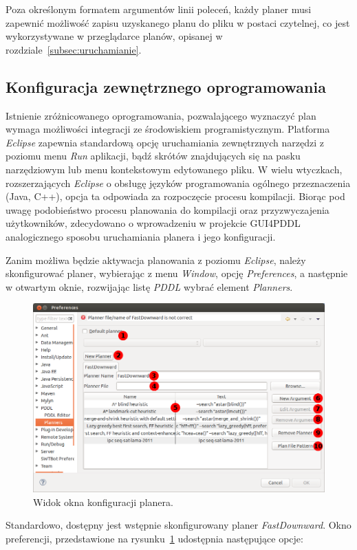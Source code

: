 Poza określonym formatem argumentów linii poleceń, każdy planer musi zapewnić możliwość zapisu uzyskanego planu do pliku w postaci czytelnej, co jest wykorzystywane w przeglądarce planów, opisanej w rozdziale~\ref{subsec:uruchamianie}.

\subsection{Konfiguracja zewnętrznego oprogramowania}
\label{subsec:konfiguracja}
Istnienie zróżnicowanego oprogramowania, pozwalającego wyznaczyć plan wymaga możliwości integracji ze środowiskiem programistycznym. Platforma \emph{Eclipse} zapewnia standardową opcję uruchamiania zewnętrznych narzędzi z poziomu menu \emph{Run} aplikacji, bądź skrótów znajdujących się na pasku narzędziowym lub menu kontekstowym edytowanego pliku. W wielu wtyczkach, rozszerzających \emph{Eclipse} o obsługę języków programowania ogólnego przeznaczenia (Java, C++), opcja ta odpowiada za rozpoczęcie procesu kompilacji. Biorąc pod uwagę podobieństwo procesu planowania do kompilacji oraz przyzwyczajenia użytkowników, zdecydowano o wprowadzeniu w projekcie GUI4PDDL analogicznego sposobu uruchamiania planera i jego konfiguracji.

Zanim możliwa będzie aktywacja planowania z poziomu \emph{Eclipse}, należy skonfigurować planer, wybierając z menu \emph{Window}, opcję \emph{Preferences}, a następnie w otwartym oknie, rozwijając listę \emph{PDDL} wybrać element \emph{Planners}.

\begin{figure}[h!]
    \centering
    \includegraphics[width=\textwidth]{img/planner_preferences_window}
    \caption{Widok okna konfiguracji planera.}
    \label{fig:preferences_window}
\end{figure}
Standardowo, dostępny jest wstępnie skonfigurowany planer \emph{FastDownward}. Okno preferencji, przedstawione na rysunku~\ref{fig:preferences_window}  udostępnia następujące opcje:

